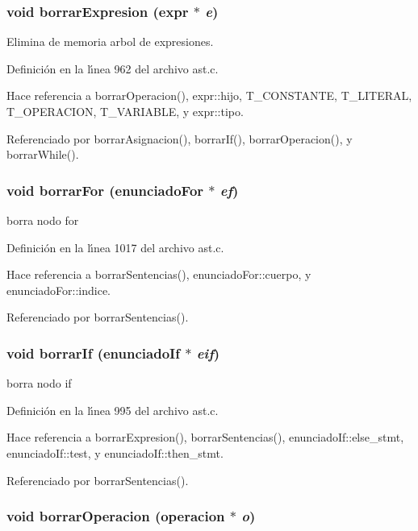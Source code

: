 \subsubsection{\setlength{\rightskip}{0pt plus 5cm}void borrar\-Expresion ({\bf expr} $\ast$ {\em e})}\label{ast_8h_a64}


Elimina de memoria arbol de expresiones. 



Definici\'{o}n en la l\'{\i}nea 962 del archivo ast.c.

Hace referencia a borrar\-Operacion(), expr::hijo, T\_\-CONSTANTE, T\_\-LITERAL, T\_\-OPERACION, T\_\-VARIABLE, y expr::tipo.

Referenciado por borrar\-Asignacion(), borrar\-If(), borrar\-Operacion(), y borrar\-While().
\subsubsection{\setlength{\rightskip}{0pt plus 5cm}void borrar\-For ({\bf enunciado\-For} $\ast$ {\em ef})}\label{ast_8h_a68}


borra nodo for 



Definici\'{o}n en la l\'{\i}nea 1017 del archivo ast.c.

Hace referencia a borrar\-Sentencias(), enunciado\-For::cuerpo, y enunciado\-For::indice.

Referenciado por borrar\-Sentencias().
\subsubsection{\setlength{\rightskip}{0pt plus 5cm}void borrar\-If ({\bf enunciado\-If} $\ast$ {\em eif})}\label{ast_8h_a66}


borra nodo if 



Definici\'{o}n en la l\'{\i}nea 995 del archivo ast.c.

Hace referencia a borrar\-Expresion(), borrar\-Sentencias(), enunciado\-If::else\_\-stmt, enunciado\-If::test, y enunciado\-If::then\_\-stmt.

Referenciado por borrar\-Sentencias().
\subsubsection{\setlength{\rightskip}{0pt plus 5cm}void borrar\-Operacion ({\bf operacion} $\ast$ {\em o})}\label{ast_8h_a65}



